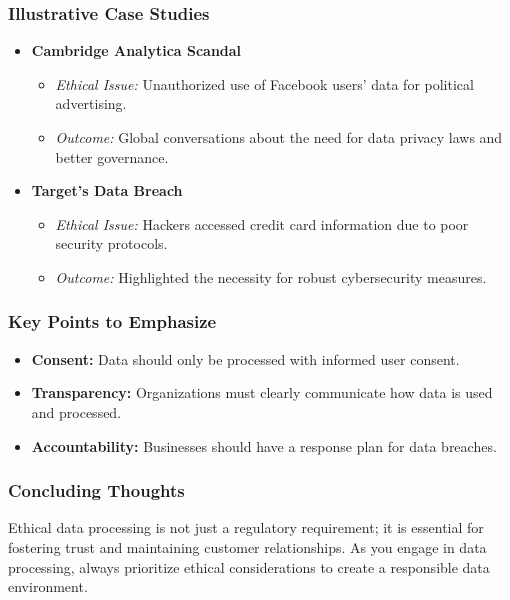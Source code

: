 \documentclass[aspectratio=169]{beamer}
\begin{document}
\begin{frame}[fragile]
    \frametitle{Illustrative Case Studies}
    \begin{itemize}
        \item \textbf{Cambridge Analytica Scandal}
            \begin{itemize}
                \item \textit{Ethical Issue:} Unauthorized use of Facebook users' data for political advertising.
                \item \textit{Outcome:} Global conversations about the need for data privacy laws and better governance.
            \end{itemize}

        \item \textbf{Target's Data Breach}
            \begin{itemize}
                \item \textit{Ethical Issue:} Hackers accessed credit card information due to poor security protocols.
                \item \textit{Outcome:} Highlighted the necessity for robust cybersecurity measures.
            \end{itemize}
    \end{itemize}
\end{frame}

\begin{frame}[fragile]
    \frametitle{Key Points to Emphasize}
    \begin{itemize}
        \item \textbf{Consent:} Data should only be processed with informed user consent.
        \item \textbf{Transparency:} Organizations must clearly communicate how data is used and processed.
        \item \textbf{Accountability:} Businesses should have a response plan for data breaches.
    \end{itemize}
\end{frame}

\begin{frame}[fragile]
    \frametitle{Concluding Thoughts}
    Ethical data processing is not just a regulatory requirement; it is essential for fostering trust and maintaining customer relationships. As you engage in data processing, always prioritize ethical considerations to create a responsible data environment.
\end{frame}
\end{document}
